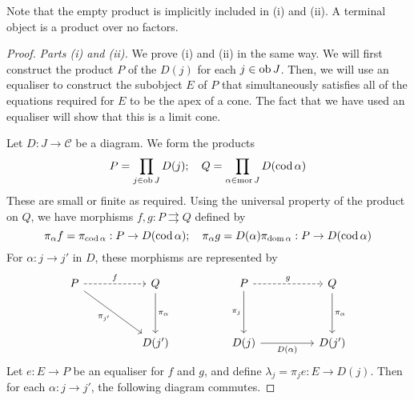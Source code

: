 Note that the empty product is implicitly included in (i) and (ii).
A terminal object is a product over no factors.
\begin{proof}
    \emph{Parts (i) and (ii).}
    We prove (i) and (ii) in the same way.
    We will first construct the product \( P \) of the \( D(j) \) for each \( j \in \operatorname{ob} J \).
    Then, we will use an equaliser to construct the subobject \( E \) of \( P \) that simultaneously satisfies all of the equations required for \( E \) to be the apex of a cone.
    The fact that we have used an equaliser will show that this is a limit cone.

    Let \( D : J \to \mathcal C \) be a diagram.
    We form the products
    \[ P = \prod_{j \in \operatorname{ob} J} D(j);\quad Q = \prod_{\alpha \in \operatorname{mor} J} D(\operatorname{cod} \alpha) \]
    These are small or finite as required.
    Using the universal property of the product on \( Q \), we have morphisms \( f, g : P \rightrightarrows Q \) defined by
    \[ \pi_\alpha f = \pi_{\operatorname{cod} \alpha} : P \to D(\operatorname{cod} \alpha);\quad \pi_\alpha g = D(\alpha) \pi_{\operatorname{dom} \alpha} : P \to D(\operatorname{cod} \alpha) \]
    For \( \alpha : j \to j' \) in \( D \), these morphisms are represented by
\[\begin{tikzcd}
	P && Q && P && Q \\
	\\
	&& {D(j')} && {D(j)} && {D(j')}
	\arrow["{\pi_j}"', from=1-5, to=3-5]
	\arrow["{D(\alpha)}"', from=3-5, to=3-7]
	\arrow["{\pi_\alpha}", from=1-7, to=3-7]
	\arrow["g", dashed, from=1-5, to=1-7]
	\arrow["f", dashed, from=1-1, to=1-3]
	\arrow["{\pi_\alpha}", from=1-3, to=3-3]
	\arrow["{\pi_{j'}}"', from=1-1, to=3-3]
\end{tikzcd}\]
    Let \( e : E \to P \) be an equaliser for \( f \) and \( g \), and define \( \lambda_j = \pi_j e : E \to D(j) \).
    Then for each \( \alpha : j \to j' \), the following diagram commutes.

\end{proof}
